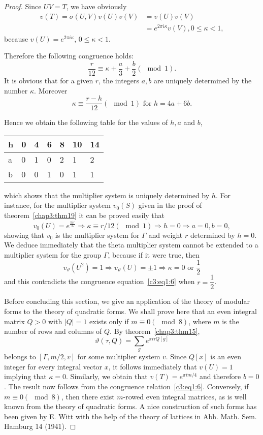 \begin{proof}
Since $UV=T$, we have obviously
\begin{align*}
v(T) = \sigma(U,V)v(U)v(V) & = v(U)v(V)\\
& = e^{2\pi i\kappa} v(V), 0\leq \kappa < 1,
\end{align*}
because $v(U)=e^{2\pi i \kappa}$, $0\leq \kappa <1$. 

Therefore the following congruence holds:
\begin{equation*}
\frac{r}{12} \equiv \kappa + 
\frac{a}{3} + \frac{b}{2} (\mod 1). \tag{6}\label{c3:eq1:6}
\end{equation*}
It is obvious that for a given $r$, the integers $a,b$ are uniquely
determined by the number $\kappa$. Moreover
$$
\kappa \equiv \frac{r-h}{12} (\mod 1) \text{ for } h = 4a +6b.
$$

Hence we obtain the following table for the values of $h,a$ and $b$,
\begin{center}
\renewcommand{\arraystretch}{1.2}
\tabcolsep=12pt
\begin{tabular}{l|llllll}
h & 0 & 4 & 6 & 8 & 10 & 14\\\hline
a & 0 & 1 & 0 & 2 & 1 & 2\\\hline
b & 0 & 0 & 1 & 0 & 1 & 1\\
\end{tabular}
\end{center}
which \pageoriginale shows that the multiplier system is uniquely
determined by $h$. For instance, for the multiplier system $v_0(S)$
given in the proof of theorem~\ref{chap3:thm19} it can be proved easily that 
$$
v_0(U)=e^{\frac{\pi i r}{6}} \Longrightarrow \kappa \equiv r/12 (\mod
1) \Longrightarrow h = 0 \Longrightarrow a = 0, b=0,
$$
showing that $v_0$ is the multiplier system for $\Gamma$ and weight
$r$ determined by $h=0$. We deduce immediately that the theta
multiplier system cannot be extended to a multiplier system for the
group $\Gamma$, because if it were true, then 
$$
v_{\vartheta} (U^2) = 1 \Longrightarrow v_{\vartheta} (U) = \pm 1
\Longrightarrow \kappa = 0 \text{ or } \frac{1}{2}
$$
and this contradicts the congruence equation~\eqref{c3:eq1:6} when $r=\dfrac{1}{2}$.

Before concluding this section, we give an application of the theory
of modular forms to the theory of quadratic forms. We shall prove here
that an even integral matrix $Q>0$ with $|Q|=1$ exists only if
$m\equiv 0(\mod 8)$, where $m$ is the number of rows and columns of
$Q$. By theorem~\ref{chap3:thm15},
$$
\vartheta(\tau, Q) = \sum_g e^{\pi i \tau Q[g]}
$$
belongs to $[\Gamma, m/2, v]$ for some multiplier system $v$. Since
$Q[x]$ is an even integer for every integral vector $x$, it follows
immediately that $v(U)=1$ implying that $\kappa=0$. Similarly, we
obtain that $v(T)=e^{\pi i m/4}$ and therefore $b=0$. The result now
follows from the congruence relation~\ref{c3:eq1:6}. Conversely, if $m\equiv
0(\mod 8)$, then there exist $m$-rowed even integral matrices, 
as \pageoriginale is well known from the theory of quadratic forms. A
nice construction of such forms has been given by E. Witt with the
help of the theory of lattices in Abh. Math. Sem. Hamburg 14 (1941).
\end{proof}

